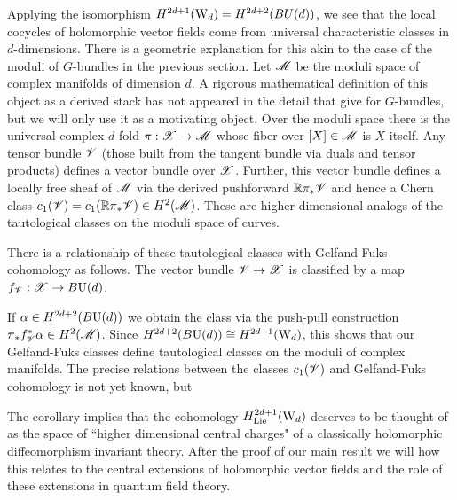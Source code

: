 Applying the isomorphism $H^{2d+1}({\rm W}_d) = H^{2d+2}(BU(d))$, we see that the local cocycles of holomorphic vector fields come from universal characteristic classes in $d$-dimensions. 
There is a geometric explanation for this akin to the case of the moduli of $G$-bundles in the previous section.
Let $\mathscr M$ be the moduli space of complex manifolds of dimension $d$.
A rigorous mathematical definition of this object as a derived stack has not appeared in the detail that \cite{FHK} give for $G$-bundles, but we will only use it as a motivating object. 
Over the moduli space there is the universal complex $d$-fold $\pi : \mathscr X \to \mathscr M$ whose fiber over $[X] \in \mathscr M$ is $X$ itself. 
Any tensor bundle $\mathscr V$ (those built from the tangent bundle via duals and tensor products) defines a vector bundle over $\mathscr X$. 
Further, this vector bundle defines a locally free sheaf of $\mathscr M$ via the derived pushforward $\mathbb R \pi_* \mathscr V$ and hence a Chern class $c_1(\mathscr V) = c_1(\mathbb R \pi_* \mathscr V) \in H^2(\mathscr M)$. 
These are higher dimensional analogs of the tautological classes on the moduli space of curves.

There is a relationship of these tautological classes with Gelfand-Fuks cohomology as follows. The vector bundle $\mathscr V \to \mathscr X$ is classified by a map $f_{\mathscr V} : \mathscr X \to B {\rm U}(d)$. 
\ben
{}
\een
If $\alpha \in H^{2d+2} (B {\rm U}(d))$ we obtain the class via the push-pull construction $\pi_* f_{\mathscr V}^* \alpha \in H^2(\mathscr M)$.
Since $H^{2d+2} (B {\rm U}(d)) \cong H^{2d+1}({\rm W}_d)$, this shows that our Gelfand-Fuks classes define tautological classes on the moduli of complex manifolds. 
The precise relations between the classes $c_1(\mathscr V)$ and Gelfand-Fuks cohomology is not yet known, but 



The corollary implies that the cohomology $H^{2d+1}_{\rm Lie}({\rm W}_d)$ deserves to be thought of as the space of ``higher dimensional central charges" of a classically holomorphic diffeomorphism invariant theory. 
After the proof of our main result we will how this relates to the central extensions of holomorphic vector fields and the role of these extensions in quantum field theory.

